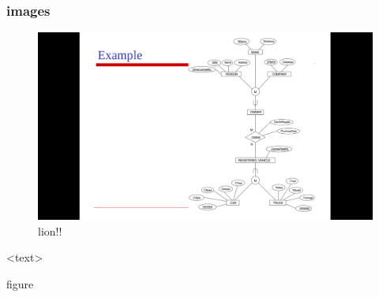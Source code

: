 \begin{frame}
\frametitle{images}
\begin{figure}
\includegraphics[scale=0.5]{lion}
\caption{lion!!}
\end{figure}
<text>
\end{frame}

figure